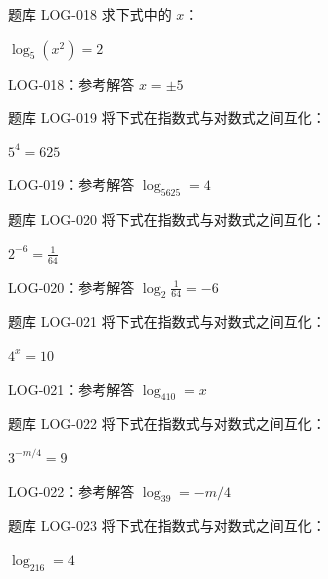 \documentclass[aspectratio=169,10pt]{beamer}
\begin{document}
\begin{campuspractice}{题库 LOG-018}
求下式中的 $x$：\par
$\log_5(x^2)=2$
\end{campuspractice}

\ifdefined\TeacherEdition
\begin{frame}[t]{LOG-018：参考解答}
$x=\pm5$
\end{frame}
\fi

\begin{campuspractice}{题库 LOG-019}
将下式在指数式与对数式之间互化：\par
$5^4=625$
\end{campuspractice}

\ifdefined\TeacherEdition
\begin{frame}[t]{LOG-019：参考解答}
$\log_5625=4$
\end{frame}
\fi

\begin{campuspractice}{题库 LOG-020}
将下式在指数式与对数式之间互化：\par
$2^{-6}=\frac{1}{64}$
\end{campuspractice}

\ifdefined\TeacherEdition
\begin{frame}[t]{LOG-020：参考解答}
$\log_2\frac1{64}=-6$
\end{frame}
\fi

\begin{campuspractice}{题库 LOG-021}
将下式在指数式与对数式之间互化：\par
$4^x=10$
\end{campuspractice}

\ifdefined\TeacherEdition
\begin{frame}[t]{LOG-021：参考解答}
$\log_410=x$
\end{frame}
\fi

\begin{campuspractice}{题库 LOG-022}
将下式在指数式与对数式之间互化：\par
$3^{-m/4}=9$
\end{campuspractice}

\ifdefined\TeacherEdition
\begin{frame}[t]{LOG-022：参考解答}
$\log_39=-m/4$
\end{frame}
\fi

\begin{campuspractice}{题库 LOG-023}
将下式在指数式与对数式之间互化：\par
$\log_216=4$
\end{campuspractice}
\end{document}
